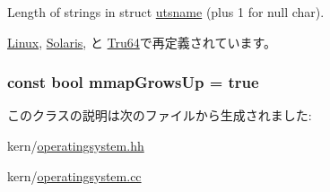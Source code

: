 Length of strings in struct \hyperlink{structOperatingSystem_1_1utsname}{utsname} (plus 1 for null char). 

\hyperlink{classLinux_a1a19d4c9718c9a4ad5fa2e48271fccc9}{Linux}, \hyperlink{classSolaris_a1a19d4c9718c9a4ad5fa2e48271fccc9}{Solaris}, と \hyperlink{classTru64_a1a19d4c9718c9a4ad5fa2e48271fccc9}{Tru64}で再定義されています。\hypertarget{classOperatingSystem_a913e273b1e48eb022f86828d53a16f7c}{
\subsubsection[{mmapGrowsUp}]{\setlength{\rightskip}{0pt plus 5cm}const bool {\bf mmapGrowsUp} = true}}
\label{classOperatingSystem_a913e273b1e48eb022f86828d53a16f7c}


このクラスの説明は次のファイルから生成されました:\begin{DoxyCompactItemize}
\item 
kern/\hyperlink{operatingsystem_8hh}{operatingsystem.hh}\item 
kern/\hyperlink{operatingsystem_8cc}{operatingsystem.cc}\end{DoxyCompactItemize}
